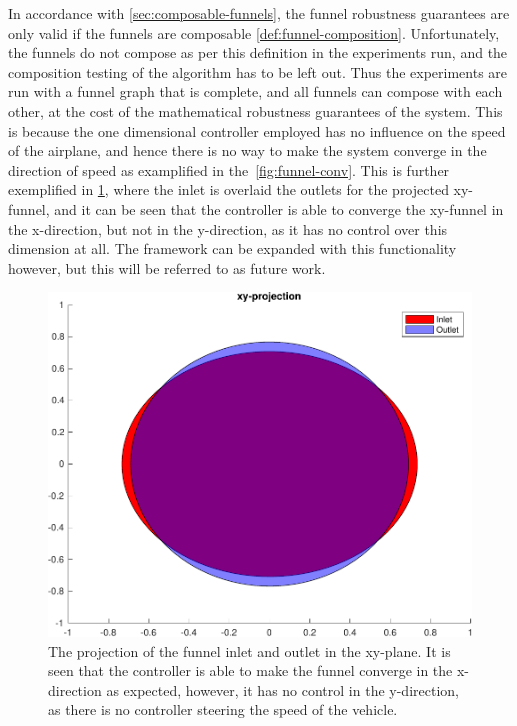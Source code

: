 In accordance with \cref{sec:composable-funnels}, the funnel robustness
guarantees are only valid if the funnels are composable 
\cref{def:funnel-composition}. Unfortunately, the funnels do not
compose as per this definition in the experiments run, and the composition
testing of the algorithm has to be left out. Thus the experiments are run with a
funnel graph that is complete, and all funnels can compose with each other, at
the cost of the mathematical robustness guarantees of the system. This is
because the one dimensional controller employed has no influence on the speed of
the airplane, and hence there is no way to make the system converge in the
direction of speed as examplified in the~\cref{fig:funnel-conv}. This is further
exemplified in \cref{fig:funnel-inlet-outlet}, where the inlet is overlaid the
outlets for the projected xy-funnel, and it can be seen that the controller is
able to converge the xy-funnel in the x-direction, but not in the y-direction,
as it has no control over this dimension at all. The framework can be expanded
with this functionality however, but this will be referred to as future work.

\begin{figure}[!t]
  \centering
  \includegraphics[width=.8\columnwidth]{figures/experiments/funnel-inlet-outlet}
  \caption[The projection of the funnel inlet and outlet in the xy-plane]{The projection of the funnel inlet and outlet in the xy-plane. It is
    seen that the controller is able to make the funnel converge in the
    x-direction as expected, however, it has no control in the y-direction, as
    there is no controller steering the speed of the vehicle.}
  \label{fig:funnel-inlet-outlet}
\end{figure}

